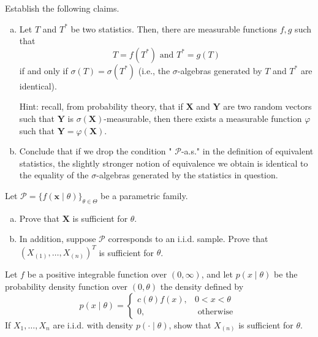 \begin{exercise}
    Establish the following claims. 
    \begin{enumerate}[(a)]
        \item Let \(T\) and \(T^{*}\) be two statistics. Then, there are measurable functions \(f, g\) such that 
        \[
            T=f\left(T^{*}\right)\text{ and }T^{*}=g(T)
        \]
        if and only if \(\sigma(T)=\sigma\left(T^{*}\right)\)
        (i.e., the \(\sigma\)-algebras generated by \(T\) and \(T^{*}\) are identical). 
        
        Hint: recall, from probability theory, that if \(\mathbf{X}\) and \(\mathbf{Y}\) are two random vectors such that \(\mathbf{Y}\) is \(\sigma(\mathbf{X})\)-measurable, then there exists a measurable function \(\varphi\) such that \(\mathbf{Y}=\varphi(\mathbf{X})\). 
        \item Conclude that if we drop the condition " \(\mathcal{P}\)-a.s." in the definition of equivalent statistics, the slightly stronger notion of equivalence we obtain is identical to the equality of the \(\sigma\)-algebras generated by the statistics in question. 
    \end{enumerate}
\end{exercise}

\begin{exercise}
    Let \(\mathcal{P}=\{f(\mathbf{x} \mid \theta)\}_{\theta \in \Theta}\) be a parametric family. 
    \begin{enumerate}[(a)]
        \item Prove that \(\mathbf{X}\) is sufficient for \(\theta\). 
        \item In addition, suppose \(\mathcal{P}\) corresponds to an i.i.d. sample. Prove that \(\left(X_{(1)}, \ldots, X_{(n)}\right)^T\) is sufficient for \(\theta\). 
    \end{enumerate}
\end{exercise}

\begin{exercise}
    Let \(f\) be a positive integrable function over \((0, \infty)\), and let \(p(x \mid \theta)\) be the probability density function over \((0, \theta)\) the density defined by
    \[
        p(x \mid \theta)=\left\{\begin{array}{cl}
        c(\theta) f(x), & 0<x<\theta \\
        0, & \text { otherwise }
        \end{array}\right.
    \]
    If \(X_{1}, \ldots, X_{n}\) are i.i.d. with density \(p(\cdot \mid \theta)\), show that \(X_{(n)}\) is sufficient for \(\theta\). 
\end{exercise}


